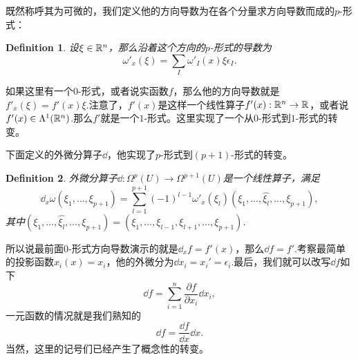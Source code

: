 \documentclass[8pt]{book}
\theoremstyle{plain}%
\newtheorem{defi}{Definition}[section]%
\begin{document}
既然称呼其为可微的，我们定义他的方向导数为在各个分量求方向导数而成的$p$-形式：
\begin{defi}
设$\xi \in \mathbb{R}^n$，那么沿着这个方向的$p$-形式的导数为
\[
\omega'_x(\xi)=\sum_I\omega'_I(x)\xi \epsilon_I.
\]
\end{defi}
如果这里有一个$0$-形式，或者说实函数$f$，那么他的方向导数就是$f'_x(\xi)=f'(x)\xi$.注意了，$f'(x)$是这样一个线性算子$f'(x):\mathbb{R}^n\to \mathbb{R}$，或者说$f'(x)\in \Lambda^1(\mathbb{R}^n)$.那么$f'$就是一个$1$-形式。这里实现了一个从$0$-形式到$1$-形式的转变。

下面定义的外微分算子$\dd$，他实现了$p$-形式到$(p+1)$-形式的转变。
\begin{defi}
外微分算子$\dd:\Omega^p(U)\to\Omega^{p+1}(U)$是一个线性算子，满足
\[
\dd_x\omega(\xi_1,\dots,\xi_{p+1})=\sum_{l=1}^{p+1}(-1)^{l-1}\omega'_x(\xi_l)(\xi_1,\dots,\hat{\xi_l},\dots,\xi_{p+1}),
\]
其中$(\xi_1,\dots,\hat{\xi_l},\dots,\xi_{p+1})=(\xi_1,\dots,\xi_{l-1},\xi_{l+1},\dots,\xi_{p+1})$.
\end{defi}
所以说最前面$0$-形式方向导数演示的就是$\dd_x f=f'(x)$，那么$\dd f=f'$.考察最简单的投影函数$x_i(x)=x_i$，他的外微分为$\dd x_i=x_i'=\epsilon_i$.最后，我们就可以改写$\dd f$如下
\begin{equation}
\label{dd1}
\dd f =\sum_{i=1}^n\frac{\partial f}{\partial x_i}\dd x_i,
\end{equation}
一元函数的情况就是我们熟知的
\[
\dd f =\frac{\dd f}{\dd x}\dd x.
\]
当然，这里的记号们已经产生了概念性的转变。
\end{document}
